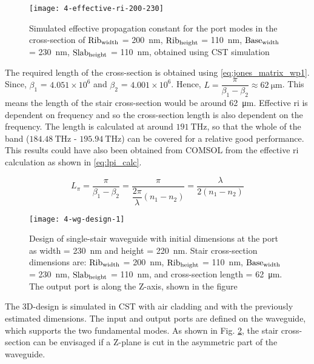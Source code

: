 \documentclass[../report.tex]{subfiles}
\begin{document}
\begin{figure}[H] %
	\centering
	\texttt{[image: 4-effective-ri-200-230]}
	\caption{Simulated effective propagation constant for the port modes in the cross-section of $\mathrm{Rib_{width}}$ = \SI{200}{\nano \meter}, $\mathrm{Rib_{height}}$ = \SI{110}{\nano \meter}, $\mathrm{Base_{width}}$ = \SI{230}{\nano \meter}, $\mathrm{Slab_{height}}$ = \SI{110}{\nano \meter}, obtained using CST simulation}
	\label{fig:4_effective_ri_200_230}
\end{figure}

\noindent The required length of the cross-section is obtained using \ref{eq:jones_matrix_wp1}. Since, $\beta_1$ = $4.051 \times 10^6$  and $\beta_2$ = $4.001 \times 10^6$. Hence, $L = \dfrac{\pi}{\beta_1 - \beta_2} \approx \SI{62}{\micro \meter}$. This means the length of the stair cross-section would be around \SI{62}{\micro \meter}. Effective \gls{ri} is dependent on frequency and so the cross-section length is also dependent on the frequency. The length is calculated at around $\SI{191}{\THz}$, so that the whole of the band ($\SI{184.48}{\THz}$ - $\SI{195.94}{\THz}$) can be covered for a relative good performance. This results could have also been obtained from COMSOL from the effective \gls{ri} calculation as shown in \ref{eq:lpi_calc}.

\begin{equation}\label{eq:lpi_calc}
L_\pi =  \dfrac {\pi} {\beta_1 - \beta_2} = \dfrac {\pi} {\dfrac {2\pi} {\lambda}\left(n_1 - n_2\right)} = \dfrac {\lambda} {2(n_1 - n_2)}
\end{equation}

\begin{figure}[H] %
	\centering
	\texttt{[image: 4-wg-design-1]}
	\caption{Design of single-stair waveguide with initial dimensions at the port as width = \SI{230}{\nano \meter} and height = \SI{220}{\nano \meter}. Stair cross-section dimensions are: $\mathrm{Rib_{width}}$ = \SI{200}{\nano \meter}, $\mathrm{Rib_{height}}$ = \SI{110}{\nano \meter}, $\mathrm{Base_{width}}$ = \SI{230}{\nano \meter}, $\mathrm{Slab_{height}}$ = \SI{110}{\nano \meter}, and cross-section length = \SI{62}{\micro\meter}. The output port is along the Z-axis, shown in the figure}
	\label{fig:4_wg_design_1}
\end{figure}

\noindent The 3D-design is simulated in CST with air cladding and with the previously estimated dimensions. The input and output ports are defined on the waveguide, which supports the two fundamental modes. As shown in Fig. \ref{fig:4_wg_design_1}, the stair cross-section can be envisaged if a Z-plane is cut in the asymmetric part of the waveguide.\\
\end{document}
